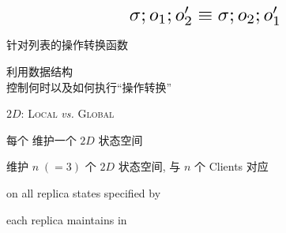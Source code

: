 \begin{frame}{}
  \begin{equation*}
    \resizebox{0.40\textwidth}{!}{$\sigma; o_1; o_2' \equiv \sigma; o_2; o_1'$}
  \end{equation*}
\end{frame}

\begin{frame}{}
  \centerline{\large 针对列表的操作转换函数~}

  \resizebox{\textwidth}{!}{
    \begin{minipage}{\textwidth}
      
    \end{minipage}
  }
\end{frame}

\begin{frame}{}
\end{frame}

\begin{frame}{}
  \begin{center}
    {\large 利用数据结构 ~ \\
    控制何时以及如何执行``操作转换''}
  \end{center}


  \begin{center}
    $2D$: {\textsc{Local}} \emph{vs.} \textsc{Global}
  \end{center}
\end{frame}

\begin{frame}{}
  \centerline{\large 每个  维护一个 $2D$ 状态空间}


  \centerline{\large {} 维护 $n \; (=3)$ 个 $2D$ 状态空间, 与 $n$ 个 Clients 对应}
\end{frame}

\begin{frame}{}
  \begin{center}
    {\large {} on all replica states specified by \blue{\wlspec{}}}

    \vspace{0.20cm}
    \vspace{0.20cm}

    {\large {} each replica maintains in }
  \end{center}
\end{frame}

